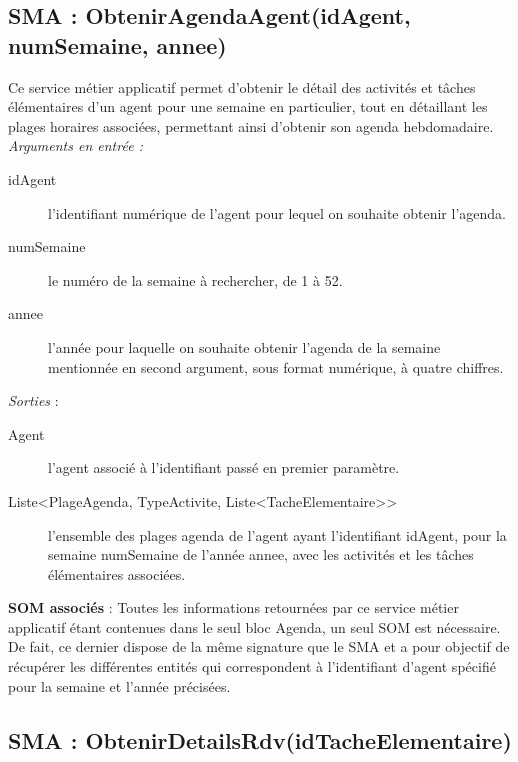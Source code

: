 \subsection{SMA : ObtenirAgendaAgent(idAgent, numSemaine, annee)}
Ce service métier applicatif permet d'obtenir le détail des activités et tâches élémentaires d'un agent pour une semaine en particulier, tout en détaillant les plages horaires associées, permettant ainsi d'obtenir son agenda hebdomadaire. \\

\noindent \textit{\textit{Arguments en entrée :}}
\begin{description}
\item[idAgent] l'identifiant numérique de  l'agent pour lequel on souhaite obtenir l'agenda. 
\item[numSemaine] le numéro de la semaine à rechercher, de 1 à 52. 
\item[annee] l'année pour laquelle on souhaite obtenir l'agenda de la semaine mentionnée en second argument, sous format numérique, à quatre chiffres. \\
\end{description}

\noindent \textit{Sorties} :

\begin{description}
\item[Agent] l'agent associé à l'identifiant passé en premier paramètre.
\item[Liste<PlageAgenda, TypeActivite, Liste<TacheElementaire>>] l'ensemble des plages agenda de l'agent ayant l'identifiant idAgent, pour la semaine numSemaine de l'année annee, avec les activités et les tâches élémentaires associées. \\
\end{description}

\begin{shaded}
\textbf{SOM associés} : Toutes les informations retournées par ce service métier applicatif étant contenues dans le seul bloc Agenda, un seul SOM est nécessaire. De fait, ce dernier dispose de la même signature que le SMA et a pour objectif de récupérer les différentes entités qui correspondent à l'identifiant d'agent spécifié pour la semaine et l'année précisées. 
\end{shaded}

\subsection{SMA : ObtenirDetailsRdv(idTacheElementaire)} 

